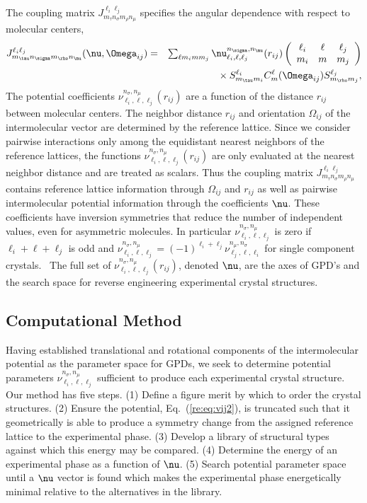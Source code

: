 \documentclass[preprint]{iucr}              %
\newcommand{\mb}[1]{\ensuremath{\mbox{\boldmath $ #1 $}}}
\begin{document}
The coupling matrix $J_{m_\tau n_\sigma m_\rho n_\mu}^{\ell_i
\ell_j}$ specifies the angular dependence with respect to molecular
centers,
\begin{eqnarray}
\label{coupling} J_{m_\tau n_\sigma m_\rho n_\mu}^{\ell_i
\ell_j}(\mb{\nu},\mb{\Omega}_{ij})&=&\sum_{\ell m_i m m_j}
\nu_{\ell_i,\ell,\ell_j}^{n_\sigma,n_\mu}(r_{ij})\left(\begin{array}{ccc}
 \ell_i & \ell & \ell_j \\ m_i & m & m_j
\end{array}\right)\nonumber\\
&&{}\times S^{\ell_i}_{m_\tau m_i}C_{m}^{\ell}(\mb{\Omega}_{ij})
S^{\ell_j}_{m_\rho m_j},
\end{eqnarray}
The potential coefficients
$\nu_{\ell_i,\ell,\ell_j}^{n_\sigma,n_\mu}(r_{ij})$ are a function
of the distance $r_{ij}$ between molecular centers. The neighbor
distance $r_{ij}$ and orientation $\Omega_{ij}$ of the
intermolecular vector are determined by the reference lattice. Since
we consider pairwise interactions only among the equidistant nearest
neighbors of the reference lattices, the functions
$\nu_{\ell_i,\ell,\ell_j}^{n_\sigma,n_\mu}(r_{ij})$ are only
evaluated at the nearest neighbor distance and are treated as
scalars. Thus the coupling matrix $J_{m_\tau n_\sigma m_\rho
n_\mu}^{\ell_i \ell_j}$ contains reference lattice information
through $\Omega_{ij}$ and $r_{ij}$ as well as pairwise
intermolecular potential information through the coefficients
$\mb{\nu}$. These coefficients have inversion symmetries that reduce
the number of independent values, even for asymmetric molecules.  In
particular $\nu_{\ell_i,\ell,\ell_j}^{n_\sigma,n_\mu}$ is zero if
$\ell_i+\ell+\ell_j$ is odd and
$\nu_{\ell_i,\ell,\ell_j}^{n_\sigma,n_\mu}=
(-1)^{\ell_i+\ell_j}\nu_{\ell_j,\ell,\ell_i}^{n_\mu,n_\sigma}$ for
single component crystals.~\cite{Avoird80} The full set of
$\nu_{\ell_i,\ell,\ell_j}^{n_\sigma,n_\mu}(r_{ij})$, denoted
$\mb{\nu}$, are the axes of GPD's and the search space for reverse
engineering experimental crystal structures.

\subsection{Computational Method}
\label{Computational_Strategy}

Having established translational and rotational components of the
intermolecular potential as the parameter space for GPDs, we seek to
determine potential parameters
$\nu_{\ell_i,\ell,\ell_j}^{n_\sigma,n_\mu}$ sufficient to produce
each experimental crystal structure. Our method has five steps. (1)
Define a figure merit by which to order the crystal structures. (2)
Ensure the potential, Eq.~(\ref{re:eq:vij2}), is truncated such that
it geometrically is able to produce a symmetry change from the
assigned reference lattice to the experimental phase. (3) Develop a
library of structural types against which this energy may be
compared. (4) Determine the energy of an experimental phase as a
function of $\mb{\nu}$. (5) Search potential parameter space until a
$\mb{\nu}$ vector is found which makes the experimental phase
energetically minimal relative to the alternatives in the library.
\end{document}
